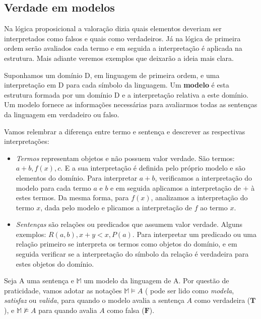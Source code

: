     \subsection{Verdade em modelos}
    
     
    Na lógica proposicional a valoração dizia quais elementos deveriam ser interpretados como falsos e quais como verdadeiros. Já na lógica de primeira ordem serão avaliados cada termo e em seguida a interpretação é aplicada na estrutura. Mais adiante veremos exemplos que deixarão a ideia mais clara.
    
    Suponhamos um domínio D, em linguagem de primeira ordem, e uma interpretação em D para cada símbolo da linguagem. Um \textbf{modelo} é esta estrutura formada por um domínio D e a interpretação relativa a este domínio. Um modelo fornece as informações necessárias para avaliarmos todas as sentenças da linguagem em verdadeiro ou falso.
    
    Vamos relembrar a diferença entre termo e sentença e descrever as respectivas interpretações:
    
    \begin{itemize}
        \item  \textit{Termos} representam objetos e não possuem valor verdade. São termos: $a + b, f(x), c$. E a sua interpretação é definida pelo próprio modelo e são elementos do domínio. Para interpretar $a + b$, verificamos a interpretação do modelo para cada termo $a$ e $b$ e em seguida aplicamos a interpretação de $+$ à estes termos. Da mesma forma, para $f(x)$, analizamos a interpretação do termo $x$, dada pelo modelo e plicamos a interpretação de $f$ ao termo $x$.
        
        \item \textit{Sentenças} são relações ou predicados que assumem valor verdade. Alguns exemplos: $ R(a,b), x + y < x, P(a)$. Para interpretar um predicado ou uma relação primeiro se interpreta os termos como objetos do domínio, e em seguida verificar se a interpretação do símbolo da relação é verdadeira para estes objetos do domínio.
        
        
    \end{itemize}
    
    Seja A uma sentença e $\mathbb{M}$ um modelo da linguagem de A. Por questão de praticidade, vamos adotar as notações $\mathbb{M} \vDash A$ ( pode ser lido como \textit{modela}, \textit{satisfaz} ou \textit{valida}, para quando o modelo  avalia a sentença $A$ como verdadeira ($ \textbf{T}$), e $\mathbb{M} \not \vDash A$ para quando  avalia $A$ como falsa ($ \textbf{F}$).
       
